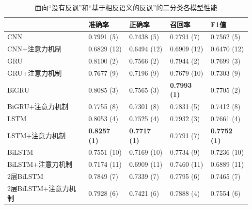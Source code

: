 \begin{table}[htb]
  \centering
  \begin{minipage}[t]{\linewidth}
  \caption{面向“没有反讽”和“基于相反语义的反讽”的二分类各模型性能}
  \label{tab:exp_irony_det_Bb01_result}
    \begin{tabularx}{\linewidth}{X|llll}
    \toprule[1.5pt]
    & 准确率 & 正确率 & 召回率 & F1值 \\
    \hline
    CNN & 0.7991 (5) & 0.7438 (5) & 0.7791 (7) & 0.7562 (5) \\ %
    CNN+注意力机制 & 0.6829 (12) & 0.6494 (12) & 0.6909 (12) & 0.6470 (12) \\ %
    \hline
    GRU & 0.8100 (2) & 0.7566 (2) & 0.7944 (2) & 0.7699 (3) \\ %
    GRU+注意力机制 & 0.7677 (9) & 0.7196 (9) & 0.7679 (10) & 0.7303 (9) \\ %
    \hline
    BiGRU & 0.8085 (3) & 0.7565 (3) & \bf 0.7993 (1) & 0.7705 (2) \\ %
    BiGRU+注意力机制 & 0.7755 (8) & 0.7301 (8) & 0.7831 (5) & 0.7412 (8) \\ %
    \hline
    LSTM & 0.8053 (4) & 0.7525 (4) & 0.7932 (3) & 0.7661 (4) \\ %
    LSTM+注意力机制 & \bf 0.8257 (1) & \bf 0.7717 (1) & 0.7791 (7) & \bf 0.7752 (1) \\ %
    \hline
    BiLSTM & 0.7551 (10) & 0.7169 (10) & 0.7734 (9) & 0.7236 (10) \\ %
    BiLSTM+注意力机制 & 0.7174 (11) & 0.6909 (11) & 0.7460 (11) & 0.6889 (11) \\ %
    \hline
    2层BiLSTM & 0.7849 (7) & 0.7339 (7) & 0.7795 (6) & 0.7465 (7) \\ %
    2层BiLSTM+注意力机制 & 0.7928 (6) & 0.7421 (6) & 0.7888 (4) & 0.7554 (6) \\ %
    \bottomrule[1.5pt]
    \end{tabularx}
  \end{minipage}
\end{table}

